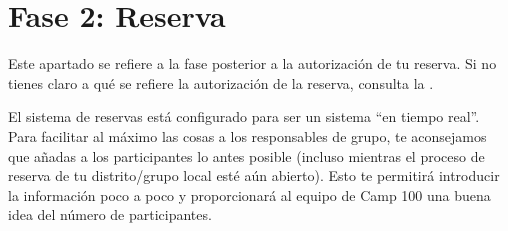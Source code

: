 \documentclass[a4paper, 11pt]{report}
\begin{document}
\chapter{Fase 2: Reserva}
\label{chap:booking}

Este apartado se refiere a la fase posterior a la autorizaci\'on de tu reserva. Si no tienes claro a qu\'e se refiere la autorizaci\'on de la reserva, consulta la .

El sistema de reservas est\'a configurado para ser un sistema ``en tiempo real''. Para facilitar al m\'aximo las cosas a los responsables de grupo, te aconsejamos que a\~nadas a los participantes lo antes posible (incluso mientras el proceso de reserva de tu distrito/grupo local est\'e a\'un abierto). Esto te permitir\'a introducir la informaci\'on poco a poco y proporcionar\'a al equipo de Camp 100 una buena idea del n\'umero de participantes. 
\end{document}
